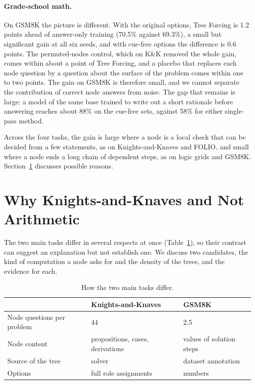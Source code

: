 \documentclass[10pt]{article}
\newcommand{\tf}{Tree Forcing}
\begin{document}
\paragraph{Grade-school math.} On GSM8K the picture is different. With the original options, \tf{} is 1.2 points ahead of answer-only training (70.5\%
against 69.3\%), a small but significant gain at all six seeds, and with cue-free options the difference is 0.6
points. The permuted-nodes control, which on K\&K removed the whole gain, comes within about a point of \tf{},
and a placebo that replaces each node question by a question about the surface of the problem comes within one to
two points. The gain on
GSM8K is therefore small, and we cannot separate the contribution of correct node answers from noise. The gap that
remains is large: a model of the same base trained to write out a short rationale before answering reaches about 88\%
on the cue-free sets, against 58\% for either single-pass method.

Across the four tasks, the gain is large where a node is a local check that can be decided from a few statements, as
on Knights-and-Knaves and FOLIO, and small where a node ends a long chain of dependent steps, as on logic grids and
GSM8K. Section~\ref{sec:mechanism} discusses possible reasons.

\section{Why Knights-and-Knaves and Not Arithmetic}
\label{sec:mechanism}

The two main tasks differ in several respects at once (Table~\ref{tab:confounds}), so their contrast can suggest an
explanation but not establish one. We discuss two candidates, the kind of computation a node asks for and the density
of the trees, and the evidence for each.

\begin{table}[t]
\centering
\small
\caption{How the two main tasks differ.}
\label{tab:confounds}
\begin{tabular}{lll}
\toprule
 & Knights-and-Knaves & GSM8K \\
\midrule
Node questions per problem & 44 & 2.5 \\
Node content & propositions, cases, derivations & values of solution steps \\
Source of the tree & solver & dataset annotation \\
Options & full role assignments & numbers \\
\bottomrule
\end{tabular}
\end{table}
\end{document}
